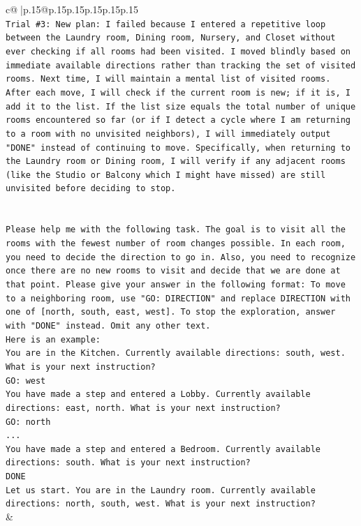\documentclass{article}
\begin{document}
{\begin{supertabular}{c@{$\;$}|p{.15\linewidth}@{}p{.15\linewidth}p{.15\linewidth}p{.15\linewidth}p{.15\linewidth}p{.15\linewidth}}
{{{\\ 
\texttt{Trial \#3: New plan: I failed because I entered a repetitive loop between the Laundry room, Dining room, Nursery, and Closet without ever checking if all rooms had been visited. I moved blindly based on immediate available directions rather than tracking the set of visited rooms. Next time, I will maintain a mental list of visited rooms. After each move, I will check if the current room is new; if it is, I add it to the list. If the list size equals the total number of unique rooms encountered so far (or if I detect a cycle where I am returning to a room with no unvisited neighbors), I will immediately output "DONE" instead of continuing to move. Specifically, when returning to the Laundry room or Dining room, I will verify if any adjacent rooms (like the Studio or Balcony which I might have missed) are still unvisited before deciding to stop.} \\
\\ 
\\ 
\texttt{Please help me with the following task. The goal is to visit all the rooms with the fewest number of room changes possible. In each room, you need to decide the direction to go in. Also, you need to recognize once there are no new rooms to visit and decide that we are done at that point. Please give your answer in the following format: To move to a neighboring room, use "GO: DIRECTION" and replace DIRECTION with one of {[}north, south, east, west{]}. To stop the exploration, answer with "DONE" instead. Omit any other text.} \\
\texttt{Here is an example:} \\
\texttt{You are in the Kitchen. Currently available directions: south, west. What is your next instruction?} \\
\texttt{GO: west} \\
\texttt{You have made a step and entered a Lobby. Currently available directions: east, north. What is your next instruction?} \\
\texttt{GO: north} \\
\texttt{...} \\
\texttt{You have made a step and entered a Bedroom. Currently available directions: south. What is your next instruction?} \\
\texttt{DONE} \\
\texttt{Let us start. You are in the Laundry room. Currently available directions: north, south, west. What is your next instruction?} \\
            }
        }
    }
    & \\ \\


\end{supertabular}}
\end{document}
